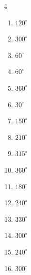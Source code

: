 \begin{multicols}{4}
\begin{enumerate}
  \item $\displaystyle 120^{\circ}$

  \item $\displaystyle 300^{\circ}$

  \item $\displaystyle 60^{\circ}$

  \item $\displaystyle 60^{\circ}$

  \item $\displaystyle 360^{\circ}$
        \phantom{$\displaystyle =2\pi$}

  \item $\displaystyle 30^{\circ}$

  \item $\displaystyle 150^{\circ}$

  \item $\displaystyle 210^{\circ}$

  \item $\displaystyle 315^{\circ}$

  \item $\displaystyle 360^{\circ}$
        \phantom{$\displaystyle =2\pi$}

  \item $\displaystyle 180^{\circ}$
        \phantom{$\displaystyle =\pi$}

  \item $\displaystyle 240^{\circ}$

  \item $\displaystyle 330^{\circ}$

  \item $\displaystyle 300^{\circ}$

  \item $\displaystyle 240^{\circ}$

  \item $\displaystyle 300^{\circ}$


\end{enumerate}
\end{multicols}
